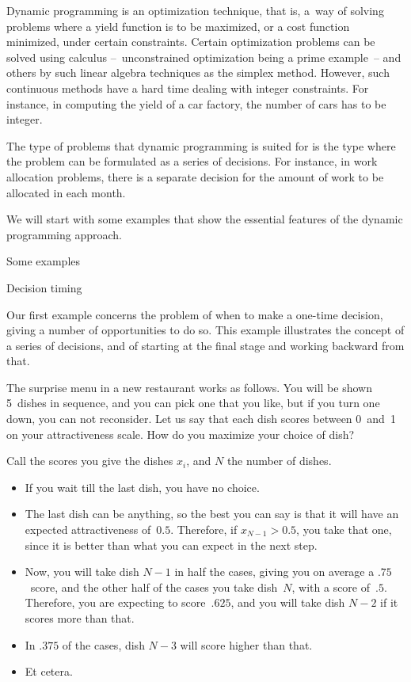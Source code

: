 Dynamic programming is an optimization technique, that is, a~way of
solving problems where a yield function is to be maximized, or a cost
function minimized, under certain constraints. Certain optimization
problems can be solved using calculus --~unconstrained optimization
being a prime example~-- and others by such linear algebra techniques
as the simplex method. However, such continuous methods have a hard
time dealing with integer constraints. For instance, in computing the
yield of a car factory, the number of cars has to be integer.

The type of problems that dynamic programming is suited for is the
type where the problem can be formulated as a series of decisions. For
instance, in work allocation problems, there is a separate decision
for the amount of work to be allocated in each month.

We will start with some examples that show the essential features of
the dynamic programming approach.

 {Some examples}

 {Decision timing}

Our first example concerns the problem of when to make a one-time
decision, giving a number of opportunities to do so. This example
illustrates the concept of a series of decisions, and of starting at
the final stage and working backward from that.

The surprise menu in a new restaurant works as follows. You will be
shown 5~dishes in sequence, and you can pick one that you like, but if you
turn one down, you can not reconsider. Let us say that each dish
scores between 0~and~1 on your attractiveness scale. How do you
maximize your choice of dish?

Call the scores you give the dishes $x_i$, and $N$ the number of dishes.
\begin{itemize}
\item If you wait till the last dish, you have no choice.
\item The last dish can be anything, so the best you can say is that
  it will have an expected attractiveness of~$0.5$. Therefore, if
  $x_{N-1}>0.5$, you take that one, since it is better than
  what you can expect in the next step.
\item Now, you will take dish $N-1$ in half the cases, giving you on
  average a $.75$~score, and the other half of the cases you take
  dish~$N$, with a score of~$.5$. Therefore, you are expecting to
  score~$.625$, and you will take dish $N-2$ if it scores more than that.
\item In $.375$ of the cases, dish $N-3$ will score higher than that.
\item Et cetera.
\end{itemize}

